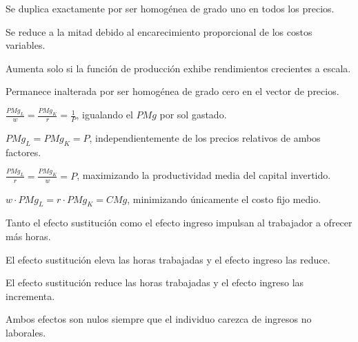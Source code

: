 \begin{opts}
    \item Se duplica exactamente por ser homogénea de grado uno en todos los precios.
    \item Se reduce a la mitad debido al encarecimiento proporcional de los costos variables.
    \item Aumenta solo si la función de producción exhibe rendimientos crecientes a escala.
    \item Permanece inalterada por ser homogénea de grado cero en el vector de precios.
\end{opts}

\begin{opts}
    \item $\frac{PMg_L}{w} = \frac{PMg_K}{r} = \frac{1}{P}$, igualando el $PMg$ por sol gastado.
    \item $PMg_L = PMg_K = P$, independientemente de los precios relativos de ambos factores.
    \item $\frac{PMg_L}{r} = \frac{PMg_K}{w} = P$, maximizando la productividad media del capital invertido.
    \item $w \cdot PMg_L = r \cdot PMg_K = CMg$, minimizando únicamente el costo fijo medio.
\end{opts}

\begin{opts}
    \item Tanto el efecto sustitución como el efecto ingreso impulsan al trabajador a ofrecer más horas.
    \item El efecto sustitución eleva las horas trabajadas y el efecto ingreso las reduce.
    \item El efecto sustitución reduce las horas trabajadas y el efecto ingreso las incrementa.
    \item Ambos efectos son nulos siempre que el individuo carezca de ingresos no laborales.
\end{opts}

